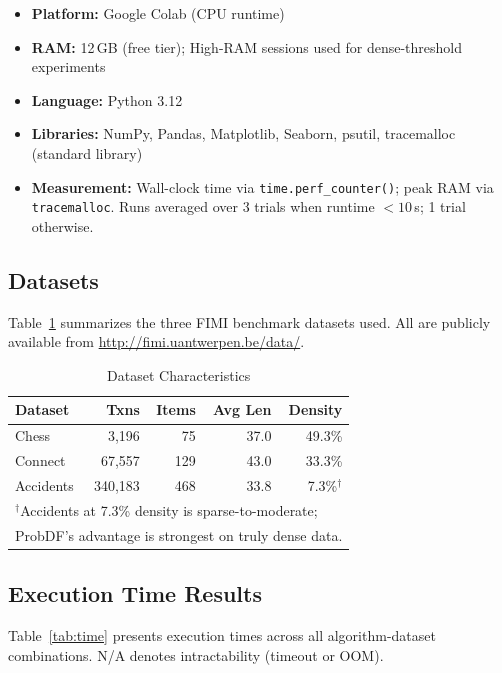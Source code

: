 \documentclass[conference]{IEEEtran}
\begin{document}
\begin{itemize}
  \item \textbf{Platform:} Google Colab (CPU runtime)
  \item \textbf{RAM:} 12\,GB (free tier); High-RAM sessions used for
    dense-threshold experiments
  \item \textbf{Language:} Python 3.12
  \item \textbf{Libraries:} NumPy, Pandas, Matplotlib, Seaborn,
    psutil, tracemalloc (standard library)
  \item \textbf{Measurement:} Wall-clock time via
    \texttt{time.perf\_counter()}; peak RAM via \texttt{tracemalloc}.
    Runs averaged over 3 trials when runtime $<10$\,s; 1 trial otherwise.
\end{itemize}

\subsection{Datasets}

Table~\ref{tab:datasets} summarizes the three FIMI benchmark datasets
used. All are publicly available from \url{http://fimi.uantwerpen.be/data/}.

\begin{table}[H]
\centering
\caption{Dataset Characteristics}
\label{tab:datasets}
\begin{tabular}{lrrrr}
\toprule
\textbf{Dataset} & \textbf{Txns} & \textbf{Items} & \textbf{Avg Len} & \textbf{Density} \\
\midrule
Chess     &   3,196 &  75 & 37.0 & 49.3\% \\
Connect   &  67,557 & 129 & 43.0 & 33.3\% \\
Accidents & 340,183 & 468 & 33.8 &  7.3\%$^\dagger$ \\
\bottomrule
\multicolumn{5}{l}{\footnotesize $^\dagger$Accidents at 7.3\% density is sparse-to-moderate;} \\
\multicolumn{5}{l}{\footnotesize ProbDF's advantage is strongest on truly dense data.}
\end{tabular}
\end{table}

\subsection{Execution Time Results}

Table~\ref{tab:time} presents execution times across all algorithm-dataset
combinations. N/A denotes intractability (timeout or OOM).
\end{document}
